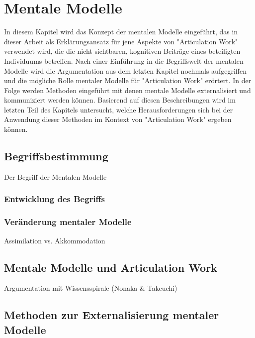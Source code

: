 \chapter{Mentale Modelle}
\label{cha:mentale_modelle}

In diesem Kapitel wird das Konzept der mentalen Modelle eingeführt, das in dieser Arbeit als Erklärungsansatz für jene Aspekte von "Articulation Work" verwendet wird, die die nicht sichtbaren, kognitiven Beiträge eines beteiligten Individuums betreffen. Nach einer Einführung in die Begriffswelt der mentalen Modelle wird die Argumentation aus dem letzten Kapitel nochmals aufgegriffen und die mögliche Rolle mentaler Modelle für "Articulation Work" erörtert. In der Folge werden Methoden eingeführt mit denen mentale Modelle externalisiert und kommuniziert werden können. Basierend auf diesen Beschreibungen wird im letzten Teil des Kapitels untersucht, welche Herausforderungen sich bei der Anwendung dieser Methoden im Kontext von "Articulation Work" ergeben können.

\section{Begriffsbestimmung}
\label{sec:mentalemodelle_begriffsbestimmung}

Der Begriff der Mentalen Modelle 

\subsection{Entwicklung des Begriffs}
\label{sub:entwicklung_des_begriffs}

\subsection{Veränderung mentaler Modelle}
\label{sub:veränderung_mentaler_modelle}
Assimilation vs. Akkommodation

\section{Mentale Modelle und Articulation Work}
\label{sec:mentale_modelle_und_articulation_work}

Argumentation mit Wissensspirale (Nonaka \& Takeuchi)

\section{Methoden zur Externalisierung mentaler Modelle}
\label{sec:methoden_zur_externalisierung_mentaler_modelle}

